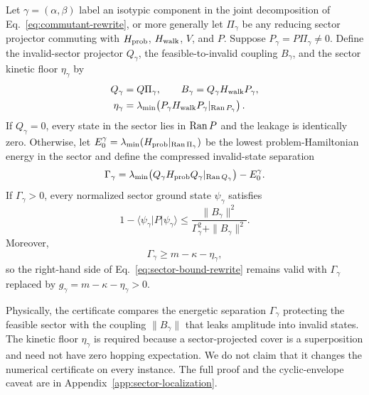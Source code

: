\begin{proposition}
\label{prop:sector-localization-rewrite}
Let $\gamma=(\alpha,\beta)$ label an isotypic component in the joint
decomposition of Eq.~\eqref{eq:commutant-rewrite}, or more generally let
$\Pi_\gamma$ be any reducing sector projector commuting with
$H_{\rm prob}$, $H_{\rm walk}$, $V$, and $P$.  Suppose
$P_\gamma=P\Pi_\gamma\ne0$.  Define the invalid-sector projector
$Q_\gamma$, the feasible-to-invalid coupling $B_\gamma$, and the sector
kinetic floor $\eta_\gamma$ by
\begin{align}
 Q_\gamma&=Q\Pi_\gamma,\quad\quad
 B_\gamma=Q_\gamma H_{\rm walk}P_\gamma,\\
 \eta_\gamma&=\lambda_{\min}\!\left(
 P_\gamma H_{\rm walk}P_\gamma|_{\operatorname{Ran} P_\gamma}\right).
\end{align}
If $Q_\gamma=0$, every state in the sector lies in $\operatorname{Ran} P$ and the leakage
is identically zero.  Otherwise, let
$E_0^\gamma=\lambda_{\min}(H_{\rm prob}|_{\operatorname{Ran}\Pi_\gamma})$ be the lowest
problem-Hamiltonian energy in the sector and define the compressed
invalid-state separation
\begin{equation}
 \Gamma_\gamma=\lambda_{\min}\!\left(
 Q_\gamma H_{\rm prob}Q_\gamma|_{\operatorname{Ran} Q_\gamma}\right)-E_0^\gamma.
\end{equation}
If $\Gamma_\gamma>0$, every normalized sector ground state $\psi_\gamma$
satisfies
\begin{equation}
 1-\langle\psi_\gamma|P|\psi_\gamma\rangle
 \leq\frac{\|B_\gamma\|^2}
 {\Gamma_\gamma^2+\|B_\gamma\|^2}.
 \label{eq:sector-bound-rewrite}
\end{equation}
Moreover,
\begin{equation}
 \Gamma_\gamma\geq m-\kappa-\eta_\gamma,
 \label{eq:sector-separation-rewrite}
\end{equation}
so the right-hand side of Eq.~\eqref{eq:sector-bound-rewrite} remains valid
with $\Gamma_\gamma$ replaced by
$g_\gamma=m-\kappa-\eta_\gamma>0$.
\end{proposition}

Physically, the certificate compares the energetic separation
$\Gamma_\gamma$ protecting the feasible sector with the coupling
$\|B_\gamma\|$ that leaks amplitude into invalid states.  The kinetic floor
$\eta_\gamma$ is required because a sector-projected cover is a
superposition and need not have zero hopping expectation.  We do not claim
that it changes the numerical certificate on every instance.
The full proof and the cyclic-envelope caveat are in
Appendix~\ref{app:sector-localization}.

